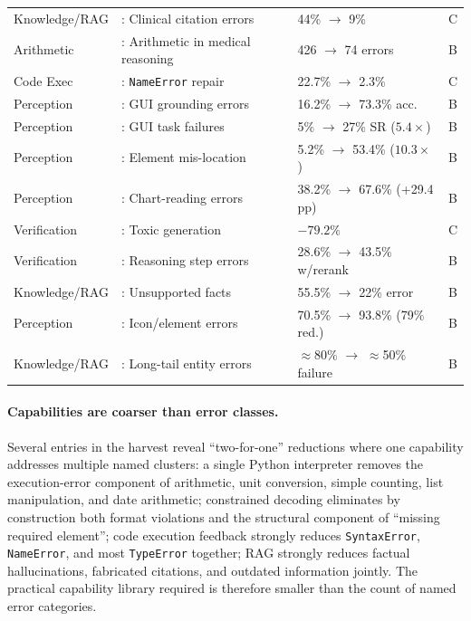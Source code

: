 \documentclass{article}
\theoremstyle{taeplain}
\theoremstyle{taedefn}
\newcommand{\teArrow}{\ensuremath{\rightarrow}}
\newcommand{\teApprox}{\ensuremath{\approx}}
\begin{document}
\begin{center}
\begin{tabular}{p{2.2cm}p{4.5cm}p{3.5cm}p{1.5cm}}
Knowledge/RAG & \citet{zakka2024almanac}: Clinical citation errors & 44\% $\teArrow$ 9\% & C\\
Arithmetic & \citet{wangb2025medrac}: Arithmetic in medical reasoning & 426 $\teArrow$ 74 errors & B\\
Code Exec & \citet{wen2024fixing}: \texttt{NameError} repair & 22.7\% $\teArrow$ 2.3\% & C\\
Perception & \citet{gou2025uground}: GUI grounding errors & 16.2\% $\teArrow$ 73.3\% acc. & B\\
Perception & \citet{xie2025jedi}: GUI task failures & 5\% $\teArrow$ 27\% SR ($5.4\times$) & B\\
Perception & \citet{cheng2024seeclick}: Element mis-location & 5.2\% $\teArrow$ 53.4\% ($10.3\times$) & B\\
Perception & \citet{liu2023deplot}: Chart-reading errors & 38.2\% $\teArrow$ 67.6\% (+29.4 pp) & B\\
Verification & \citet{gou2024critic}: Toxic generation & $-79.2\%$ & C\\
Verification & \citet{wangp2024mathshepherd}: Reasoning step errors & 28.6\% $\teArrow$ 43.5\% w/rerank & B\\
Knowledge/RAG & \citet{asai2024selfrag}: Unsupported facts & 55.5\% $\teArrow$ 22\% error & B\\
Perception & \citet{lu2024omniparser}: Icon/element errors & 70.5\% $\teArrow$ 93.8\% (79\% red.) & B\\
Knowledge/RAG & \citet{mallen2023popqa}: Long-tail entity errors & $\teApprox$80\% $\teArrow$ $\teApprox$50\% failure & B\\
\bottomrule
\end{tabular}
\end{center}

\paragraph{Capabilities are coarser than error classes.}
Several entries in the harvest reveal ``two-for-one'' reductions where one capability addresses multiple named clusters: a single Python interpreter removes the execution-error component of arithmetic, unit conversion, simple counting, list manipulation, and date arithmetic; constrained decoding eliminates by construction both format violations and the structural component of ``missing required element''; code execution feedback strongly reduces \texttt{SyntaxError}, \texttt{NameError}, and most \texttt{TypeError} together; RAG strongly reduces factual hallucinations, fabricated citations, and outdated information jointly. The practical capability library required is therefore smaller than the count of named error categories.
\end{document}
